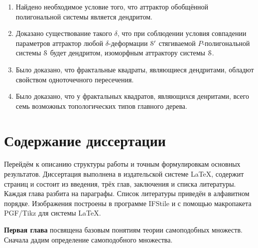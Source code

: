 \begin{enumerate}
\item Найдено необходимое условие того, что аттрактор обобщённой полигональной системы является дендритом.

\item Доказано существование такого $\delta$, что при соблюдении условия совпадении параметров аттрактор любой $\delta$-деформации ${\EuScript S}'$ стягиваемой $P$-полигональной системы ${\EuScript S}$ будет дендритом, изоморфным аттрактору системы ${\EuScript S}$.


\item Было доказано, что фрактальные квадраты, являющиеся дендритами, обладют свойством одноточечного пересечения.

\item Было доказано, что у фрактальных квадратов, являющихся денритами, всего семь возможных топологических типов главного дерева.
\end{enumerate}


\section{Содержание диссертации}


Перейдём к описанию структуры работы и точным формулировкам основных результатов.
Диссертация выполнена в издательской системе \LaTeX, содержит \red{\pageref{LastPage}} страниц и состоит из введения, трёх глав, заключения и списка литературы.
Каждая глава разбита на параграфы.
Список литературы приведён в алфавитном порядке.
Изображения построены в программе IFStile \cite{IFStile} и с помощью макропакета PGF/Tikz для системы \LaTeX.


\textbf{Первая глава} посвящена базовым понятиям теории самоподобных множеств.
Сначала дадим определение самоподобного множества. 


